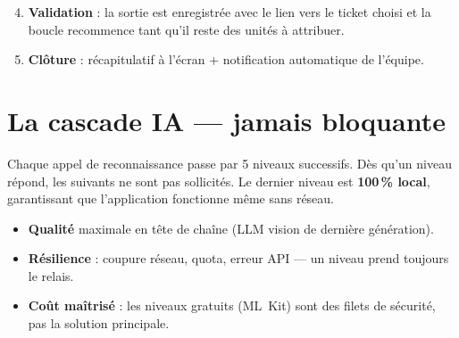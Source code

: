 \documentclass[11pt,a4paper]{article}
\begin{document}
\begin{enumerate}\setcounter{enumi}{3}
  \item \textbf{Validation} : la sortie est enregistrée avec le lien
        vers le ticket choisi et la boucle recommence tant qu'il reste
        des unités à attribuer.
  \item \textbf{Clôture} : récapitulatif à l'écran + notification
        automatique de l'équipe.
\end{enumerate}

\section{La cascade IA — jamais bloquante}

Chaque appel de reconnaissance passe par 5 niveaux successifs. Dès
qu'un niveau répond, les suivants ne sont pas sollicités. Le dernier
niveau est \textbf{100\,\% local}, garantissant que l'application
fonctionne même sans réseau.

\begin{center}
\end{center}

\begin{ideabox}
\begin{itemize}
  \item \textbf{Qualité} maximale en tête de chaîne (LLM vision de
        dernière génération).
  \item \textbf{Résilience} : coupure réseau, quota, erreur API — un
        niveau prend toujours le relais.
  \item \textbf{Coût maîtrisé} : les niveaux gratuits (ML~Kit) sont
        des filets de sécurité, pas la solution principale.
\end{itemize}
\end{ideabox}

\end{document}
